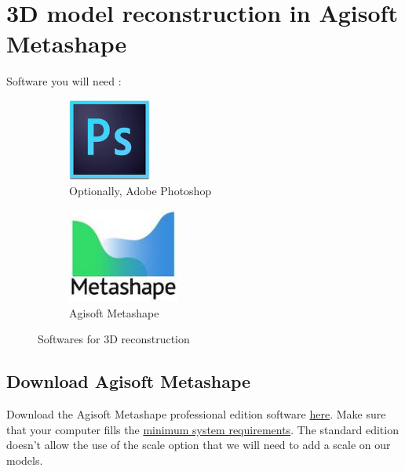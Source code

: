 \documentclass[10pt,letter,english]{article}
\begin{document}
\newpage
\section{3D model reconstruction in Agisoft Metashape}

Software you will need :

\begin{figure}[H]
\centering
\begin{subfigure}{.3\textwidth}
  \centering
  \includegraphics[width=0.3\textwidth]{Figures/logo_photoshop.png}
  \caption{Optionally, Adobe Photoshop}
  \label{}
\end{subfigure}%
\begin{subfigure}{.3\textwidth}
  \centering
  \includegraphics[width=0.4\textwidth]{Figures/logo_metashape.jpeg}
  \caption{Agisoft Metashape}
  \label{}
\end{subfigure}
\caption{Softwares for 3D reconstruction}
\label{}
\end{figure}





\subsection{Download Agisoft Metashape}

Download the Agisoft Metashape professional edition software \href{https://www.agisoft.com/downloads/installer/}{here}. Make sure that your computer fills the \href{https://www.agisoft.com/downloads/system-requirements/}{minimum system requirements}.
The standard edition doesn't allow the use of the scale option that we will need to add a scale on our models.
\end{document}
